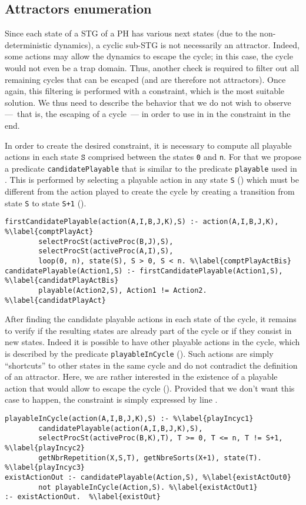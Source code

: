 \subsection{Attractors enumeration}
Since each state of a STG of a PH has various next states (due to the non-deterministic dynamics), a cyclic sub-STG is not necessarily an attractor.
Indeed, some actions may allow the dynamics to escape the cycle;
in this case, the cycle would not even be a trap domain.
Thus, another check is required to filter out all remaining cycles
that can be escaped (and are therefore not attractors).
Once again, this filtering is performed with a constraint,
which is the most suitable solution.
We thus need to describe the behavior that we do not wish to observe
---~that is, the escaping of a cycle~---
in order to use in in the constraint in the end.

In order to create the desired constraint,
it is necessary to compute all playable actions in each state $\texttt{S}$ comprised between the states \texttt{0} and \texttt{n}.
For that we propose a predicate \texttt{candidatePlayable}
that is similar to the predicate \texttt{playable} used in .
This is performed by selecting a playable action in any state \texttt{S}
()
which must be different from the action played to create the cycle
by creating a transition from state \texttt{S} to state \texttt{S+1}
().
\begin{lstlisting}
firstCandidatePlayable(action(A,I,B,J,K),S) :- action(A,I,B,J,K), %\label{comptPlayAct}
        selectProcSt(activeProc(B,J),S),
        selectProcSt(activeProc(A,I),S),
        loop(0, n), state(S), S > 0, S < n. %\label{comptPlayActBis}
candidatePlayable(Action1,S) :- firstCandidatePlayable(Action1,S), %\label{candidatPlayActBis}
        playable(Action2,S), Action1 != Action2. %\label{candidatPlayAct}
\end{lstlisting}

After finding the candidate playable actions in each state of the cycle, it remains to verify if the resulting states are already part of the cycle or if they consist in new states.
Indeed it is possible to have other playable actions in the cycle,
which is described by the predicate \texttt{playableInCycle}
().
Such actions are simply “shortcuts” to other states in the same cycle
and do not contradict the definition of an attractor.
Here, we are rather interested in the existence of a playable action
that would allow to escape the cycle
().
Provided that we don't want this case to happen,
the constraint is simply expressed by line .
\begin{lstlisting}
playableInCycle(action(A,I,B,J,K),S) :- %\label{playIncyc1}
        candidatePlayable(action(A,I,B,J,K),S),
        selectProcSt(activeProc(B,K),T), T >= 0, T <= n, T != S+1, %\label{playIncyc2}
        getNbrRepetition(X,S,T), getNbreSorts(X+1), state(T). %\label{playIncyc3}
existActionOut :- candidatePlayable(Action,S), %\label{existActOut0}
        not playableInCycle(Action,S). %\label{existActOut1}
:- existActionOut.  %\label{existOut}
\end{lstlisting}

